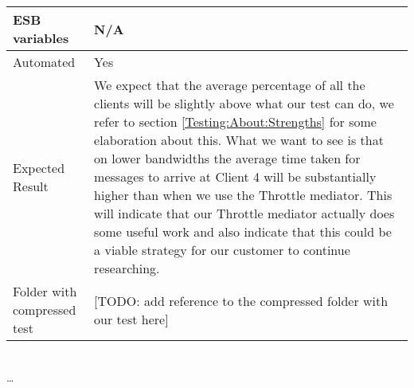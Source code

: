 \begin{center}
\begin{tabular}{| p{4cm} | p{8cm} |}
\hline
ESB variables & \textbf{N/A} \\
\hline
Automated & Yes \\
\hline
Expected Result & We expect that the average percentage of all the clients will be slightly above what our test can do, we refer to section \ref{Testing:About:Strengths} for some elaboration about this. What we want to see is that on lower bandwidths the average time taken for messages to arrive at Client 4 will be substantially higher than when we use the Throttle mediator. This will indicate that our Throttle mediator actually does some useful work and also indicate that this could be a viable strategy for our customer to continue researching. \\
\hline
Folder with compressed test & [TODO: add reference to the compressed folder with our test here]\\
\hline
\end{tabular}
\\ \ldots \\
\end{center}

